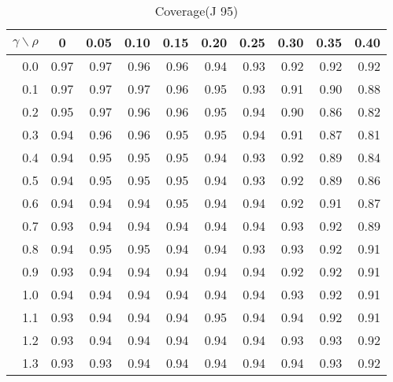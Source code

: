 \documentclass[12pt]{article}
\begin{document}
%
\begin{table}[!tbp]
\caption{Coverage(J 95)}
 \begin{center}
 \begin{tabular}{r|rrrrrrrrr}\hline\hline
\multicolumn{1}{c|}{$\gamma\backslash\rho$}&\multicolumn{1}{c}{0}&\multicolumn{1}{c}{0.05}&\multicolumn{1}{c}{0.10}&\multicolumn{1}{c}{0.15}&\multicolumn{1}{c}{0.20}&\multicolumn{1}{c}{0.25}&\multicolumn{1}{c}{0.30}&\multicolumn{1}{c}{0.35}&\multicolumn{1}{c}{0.40}\tabularnewline
\hline

0.0&0.97&0.97&0.96&0.96&0.94&0.93&0.92&0.92&0.92\tabularnewline
0.1&0.97&0.97&0.97&0.96&0.95&0.93&0.91&0.90&0.88\tabularnewline
0.2&0.95&0.97&0.96&0.96&0.95&0.94&0.90&0.86&0.82\tabularnewline
0.3&0.94&0.96&0.96&0.95&0.95&0.94&0.91&0.87&0.81\tabularnewline
0.4&0.94&0.95&0.95&0.95&0.94&0.93&0.92&0.89&0.84\tabularnewline
0.5&0.94&0.95&0.95&0.95&0.94&0.93&0.92&0.89&0.86\tabularnewline
0.6&0.94&0.94&0.94&0.95&0.94&0.94&0.92&0.91&0.87\tabularnewline
0.7&0.93&0.94&0.94&0.94&0.94&0.94&0.93&0.92&0.89\tabularnewline
0.8&0.94&0.95&0.95&0.94&0.94&0.93&0.93&0.92&0.91\tabularnewline
0.9&0.93&0.94&0.94&0.94&0.94&0.94&0.92&0.92&0.91\tabularnewline
1.0&0.94&0.94&0.94&0.94&0.94&0.94&0.93&0.92&0.91\tabularnewline
1.1&0.93&0.94&0.94&0.94&0.95&0.94&0.94&0.92&0.91\tabularnewline
1.2&0.93&0.94&0.94&0.94&0.94&0.94&0.93&0.93&0.92\tabularnewline
1.3&0.93&0.93&0.94&0.94&0.94&0.94&0.94&0.93&0.92\tabularnewline
\hline
\end{tabular}

\end{center}

\end{table}
\end{document}
